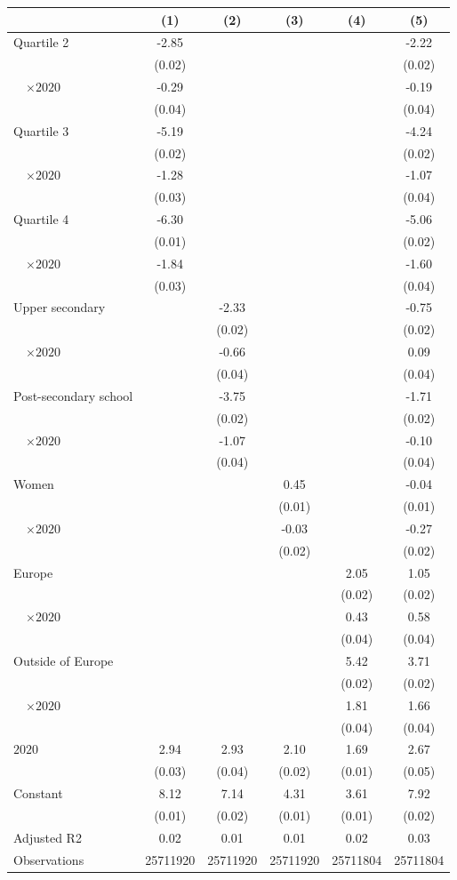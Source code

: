 
\begin{tabular}{@{}l*{5}{S[table-format={-}2.2{\tnote{***}}]}@{}}
\toprule
{} & {(1)} & {(2)} & {(3)} & {(4)} & {(5)}\tabularnewline%
\midrule
Quartile 2 & -2.85\tnote{***} &  &  &  & -2.22\tnote{***}\tabularnewline%
 & (0.02) &  &  &  & \vphantom{1} (0.02)\tabularnewline%
~~\(\times 2020\) & -0.29\tnote{***} &  &  &  & -0.19\tnote{***}\tabularnewline%
 & (0.04) &  &  &  & (0.04)\tabularnewline%
Quartile 3 & -5.19\tnote{***} &  &  &  & -4.24\tnote{***}\tabularnewline%
 & (0.02) &  &  &  & (0.02)\tabularnewline%
~~\(\times 2020\) & -1.28\tnote{***} &  &  &  & -1.07\tnote{***}\tabularnewline%
 & (0.03) &  &  &  & \vphantom{1} (0.04)\tabularnewline%
Quartile 4 & -6.30\tnote{***} &  &  &  & -5.06\tnote{***}\tabularnewline%
 & (0.01) &  &  &  & (0.02)\tabularnewline%
~~\(\times 2020\) & -1.84\tnote{***} &  &  &  & -1.60\tnote{***}\tabularnewline%
 & (0.03) &  &  &  & (0.04)\tabularnewline%
Upper secondary &  & -2.33\tnote{***} &  &  & -0.75\tnote{***}\tabularnewline%
 &  & (0.02) &  &  & \vphantom{1} (0.02)\tabularnewline%
~~\(\times 2020\) &  & -0.66\tnote{***} &  &  & 0.09\tnote{*}\tabularnewline%
 &  & (0.04) &  &  & \vphantom{1} (0.04)\tabularnewline%
Post-secondary school &  & -3.75\tnote{***} &  &  & -1.71\tnote{***}\tabularnewline%
 &  & (0.02) &  &  & (0.02)\tabularnewline%
~~\(\times 2020\) &  & -1.07\tnote{***} &  &  & -0.10\tnote{*}\tabularnewline%
 &  & (0.04) &  &  & (0.04)\tabularnewline%
Women &  &  & 0.45\tnote{***} &  & -0.04\tnote{***}\tabularnewline%
 &  &  & (0.01) &  & (0.01)\tabularnewline%
~~\(\times 2020\) &  &  & -0.03 &  & -0.27\tnote{***}\tabularnewline%
 &  &  & (0.02) &  & (0.02)\tabularnewline%
Europe &  &  &  & 2.05\tnote{***} & 1.05\tnote{***}\tabularnewline%
 &  &  &  & (0.02) & \vphantom{1} (0.02)\tabularnewline%
~~\(\times 2020\) &  &  &  & 0.43\tnote{***} & 0.58\tnote{***}\tabularnewline%
 &  &  &  & (0.04) & \vphantom{1} (0.04)\tabularnewline%
Outside of Europe &  &  &  & 5.42\tnote{***} & 3.71\tnote{***}\tabularnewline%
 &  &  &  & (0.02) & (0.02)\tabularnewline%
~~\(\times 2020\) &  &  &  & 1.81\tnote{***} & 1.66\tnote{***}\tabularnewline%
 &  &  &  & (0.04) & (0.04)\tabularnewline%
\midrule
\(2020\) & 2.94\tnote{***} & 2.93\tnote{***} & 2.10\tnote{***} & 1.69\tnote{***} & 2.67\tnote{***}\tabularnewline%
 & (0.03) & (0.04) & (0.02) & (0.01) & (0.05)\tabularnewline%
Constant & 8.12\tnote{***} & 7.14\tnote{***} & 4.31\tnote{***} & 3.61\tnote{***} & 7.92\tnote{***}\tabularnewline%
 & (0.01) & (0.02) & (0.01) & (0.01) & (0.02)\tabularnewline%
\midrule
Adjusted R2 & 0.02 & 0.01 & 0.01 & 0.02 & 0.03\tabularnewline%
Observations & {\num{25711920}} & {\num{25711920}} & {\num{25711920}} & {\num{25711804}} & {\num{25711804}}\tabularnewline%
\bottomrule
\end{tabular}
